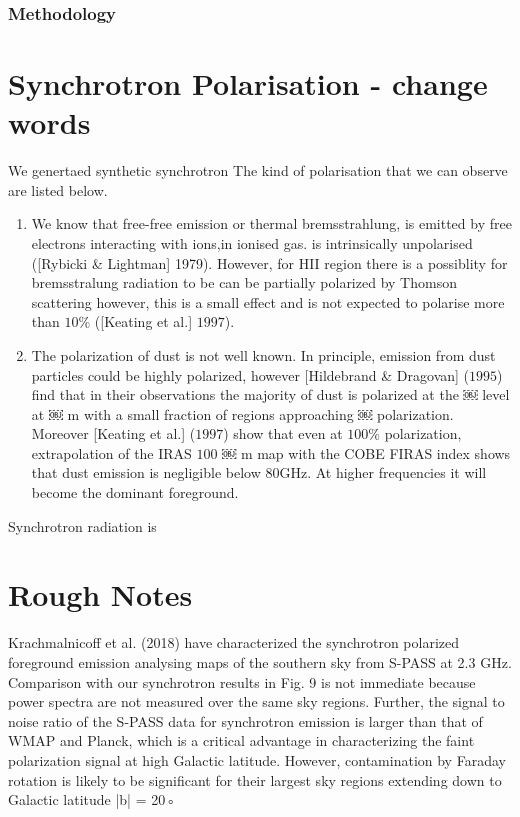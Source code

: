 \documentclass[12pt, a4 paper]{article}
\begin{document}
\subsubsection{Methodology}

\section{Synchrotron Polarisation - change words}
We genertaed synthetic synchrotron 
The kind of polarisation that we can observe are listed below.
\begin{enumerate}

    \item We know that free-free emission or thermal bremsstrahlung, is emitted by free electrons interacting with ions,in ionised gas. is intrinsically unpolarised ([Rybicki \& Lightman] 1979). However, for HII region there is a possiblity for bremsstralung radiation to be can be partially polarized by Thomson scattering however, this is a small effect and is not expected to polarise more than $10 \%$ ([Keating et al.] $1997$).

    \item The polarization of dust is not well known. In principle, emission from dust particles could be highly polarized, however [Hildebrand \& Dragovan] ($1995$) find that in their observations the majority of dust is polarized at the ￼ level at ￼ m with a small fraction of regions approaching ￼ polarization. Moreover [Keating et al.] ($1997$) show that even at $100 \%$ polarization, extrapolation of the IRAS $100$
    ￼ m map with the COBE FIRAS index shows that dust emission is negligible below 80GHz. At higher frequencies it will become the dominant foreground.
\end{enumerate}


Synchrotron radiation is 
\section{Rough Notes}
Krachmalnicoff et al. (2018) have characterized the synchrotron polarized foreground emission analysing maps of the
southern sky from S-PASS at 2.3 GHz. Comparison with our
synchrotron results in Fig. 9 is not immediate because power
spectra are not measured over the same sky regions. Further, the
signal to noise ratio of the S-PASS data for synchrotron emission is larger than that of WMAP and Planck, which is a critical
advantage in characterizing the faint polarization signal at high
Galactic latitude. However, contamination by Faraday rotation
is likely to be significant for their largest sky regions extending
down to Galactic latitude |b| = 20◦
\end{document}
